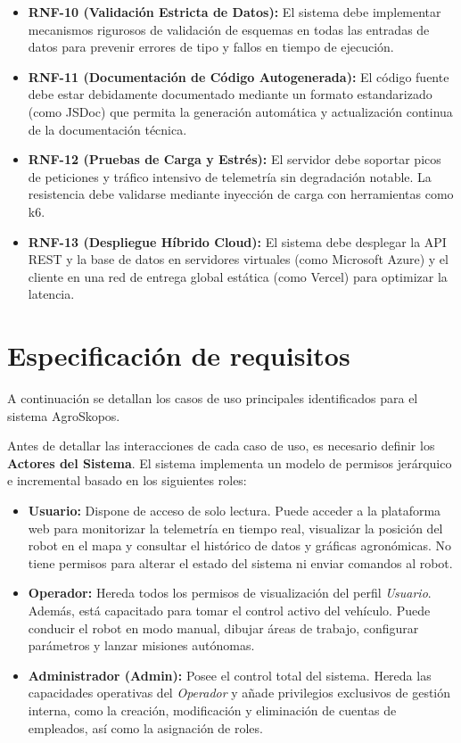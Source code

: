 \begin{itemize}
    \item \textbf{RNF-10 (Validación Estricta de Datos):} El sistema debe implementar mecanismos rigurosos de validación de esquemas en todas las entradas de datos para prevenir errores de tipo y fallos en tiempo de ejecución.
    \item \textbf{RNF-11 (Documentación de Código Autogenerada):} El código fuente debe estar debidamente documentado mediante un formato estandarizado (como JSDoc) que permita la generación automática y actualización continua de la documentación técnica.
    \item \textbf{RNF-12 (Pruebas de Carga y Estrés):} El servidor debe soportar picos de peticiones y tráfico intensivo de telemetría sin degradación notable. La resistencia debe validarse mediante inyección de carga con herramientas como k6.
    \item \textbf{RNF-13 (Despliegue Híbrido Cloud):} El sistema debe desplegar la API REST y la base de datos en servidores virtuales (como Microsoft Azure) y el cliente en una red de entrega global estática (como Vercel) para optimizar la latencia.
\end{itemize}

\section{Especificación de requisitos}
A continuación se detallan los casos de uso principales identificados para el sistema AgroSkopos.

Antes de detallar las interacciones de cada caso de uso, es necesario definir los \textbf{Actores del Sistema}. El sistema implementa un modelo de permisos jerárquico e incremental basado en los siguientes roles:
\begin{itemize}
    \item \textbf{Usuario:} Dispone de acceso de solo lectura. Puede acceder a la plataforma web para monitorizar la telemetría en tiempo real, visualizar la posición del robot en el mapa y consultar el histórico de datos y gráficas agronómicas. No tiene permisos para alterar el estado del sistema ni enviar comandos al robot.
    \item \textbf{Operador:} Hereda todos los permisos de visualización del perfil \textit{Usuario}. Además, está capacitado para tomar el control activo del vehículo. Puede conducir el robot en modo manual, dibujar áreas de trabajo, configurar parámetros y lanzar misiones autónomas.
    \item \textbf{Administrador (Admin):} Posee el control total del sistema. Hereda las capacidades operativas del \textit{Operador} y añade privilegios exclusivos de gestión interna, como la creación, modificación y eliminación de cuentas de empleados, así como la asignación de roles.
\end{itemize}

